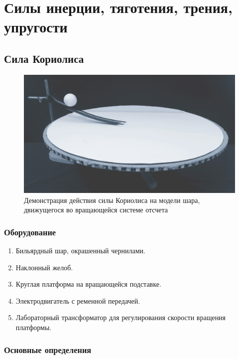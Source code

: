 \documentclass[All.tex]{subfiles}
\begin{document}
	

\chapter{\textcolor{PineGreen}{Силы инерции, тяготения, трения, упругости}}
		\section{Сила Кориолиса}
	

\begin{figure}[H] 	
	\centering 	
	\includegraphics[width=0.8\linewidth]{Coriolis-1.png}
	\caption{Демонстрация действия силы Кориолиса на модели шара, движущегося во вращающейся системе отсчета}
	\label{Coriolis-1}
\end{figure}
	
	\subsection*{\textcolor{PineGreen}{Оборудование}}

		\begin{enumerate}
			\item Бильярдный шар, окрашенный чернилами.
			\item Наклонный желоб.
			\item Круглая платформа на вращающейся подставке.
			\item Электродвигатель с ременной передачей.
			\item Лабораторный трансформатор для регулирования скорости вращения платформы.
		\end{enumerate}

		\subsection*{\textcolor{PineGreen}{Основные определения}}
		
\end{document}
